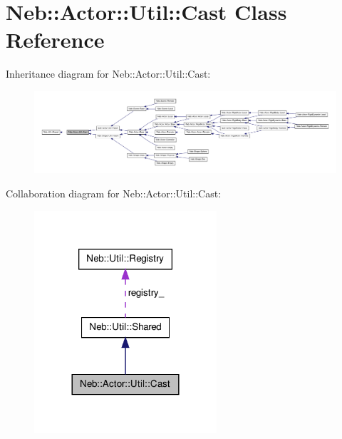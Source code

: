 \hypertarget{classNeb_1_1Actor_1_1Util_1_1Cast}{\section{\-Neb\-:\-:\-Actor\-:\-:\-Util\-:\-:\-Cast \-Class \-Reference}
\label{classNeb_1_1Actor_1_1Util_1_1Cast}
}


\-Inheritance diagram for \-Neb\-:\-:\-Actor\-:\-:\-Util\-:\-:\-Cast\-:\nopagebreak
\begin{figure}[H]
\begin{center}
\leavevmode
\includegraphics[width=350pt]{classNeb_1_1Actor_1_1Util_1_1Cast__inherit__graph}
\end{center}
\end{figure}


\-Collaboration diagram for \-Neb\-:\-:\-Actor\-:\-:\-Util\-:\-:\-Cast\-:\nopagebreak
\begin{figure}[H]
\begin{center}
\leavevmode
\includegraphics[width=192pt]{classNeb_1_1Actor_1_1Util_1_1Cast__coll__graph}
\end{center}
\end{figure}
